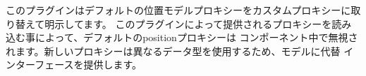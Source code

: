 \documentclass[a4paper,10pt]{article}
\newenvironment{Japanese}{%
  \CJKfamily{min}%
  \CJKtilde
  \CJKnospace}{}
\begin{document}
\begin{CJK}{UTF8}{}
\begin{Japanese}
このプラグインはデフォルトの位置モデルプロキシーをカスタムプロキシーに取り替えて明示してます。
このプラグインによって提供されるプロキシーを読み込む事によって、デフォルトのpositionプロキシーは
コンポーネント中で無視されます。新しいプロキシーは異なるデータ型を使用するため、モデルに代替
インターフェースを提供します。


\end{Japanese}
\end{CJK}
\end{document}
